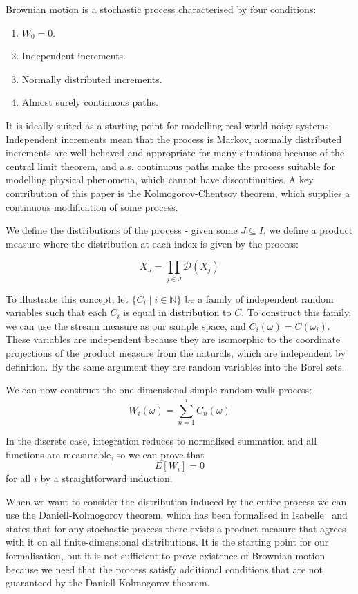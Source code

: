 \documentclass[orivec, envcountsame]{llncs}
\begin{document}
Brownian motion is a stochastic process characterised by four conditions:

\begin{enumerate}
   \item \(W_0 = 0\).
   \item Independent increments.
   \item Normally distributed increments.
   \item Almost surely continuous paths.
\end{enumerate}

It is ideally suited as a starting point for modelling real-world noisy systems. Independent increments mean that the process is Markov, normally distributed increments are well-behaved and appropriate for many situations because of the central limit theorem, and a.s. continuous paths make the process suitable for modelling physical phenomena, which cannot have discontinuities. A key contribution of this paper is the Kolmogorov-Chentsov theorem, which supplies a continuous modification of some process.

We define the distributions of the process - given some \(J \subseteq I\), we define a product measure where the distribution at each index is given by the process:

\[X_J = \prod_{j \in J} \mathcal{D}(X_j)\] %

To illustrate this concept, let \(\{C_i \mid i \in \mathbb{N}\}\) be a family of independent random variables such that each \(C_i\) is equal in distribution to \(C\). To construct this family, we can use the stream measure as our sample space, and \(C_i\left(\omega\right) = C(\omega_i)\). These variables are independent because they are isomorphic to the coordinate projections of the product measure from the naturals, which are independent by definition. By the same argument they are random variables into the Borel sets.

We can now construct the one-dimensional simple random walk process: \[W_i(\omega) = \sum_{n=1}^iC_n(\omega)\]

In the discrete case, integration reduces to normalised summation and all functions are measurable, so we can prove that \[E[W_i] = 0\] for all \(i\) by a straightforward induction.

When we want to consider the distribution induced by the entire process we can use the Daniell-Kolmogorov theorem, which has been formalised in Isabelle~\cite{immler12} and states that for any stochastic process there exists a product measure that agrees with it on all finite-dimensional distributions. It is the starting point for our formalisation, but it is not sufficient to prove existence of Brownian motion because we need that the process satisfy additional conditions that are not guaranteed by the Daniell-Kolmogorov theorem.
\end{document}
